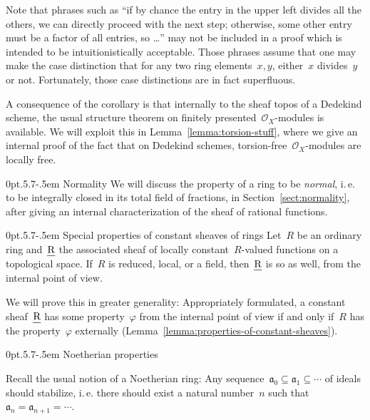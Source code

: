 \documentclass[10pt,reqno,a4paper]{amsbook}
\makeatletter
\theoremstyle{definition}
\theoremstyle{plain}
\theoremstyle{remark}
\renewcommand{\O}{\mathcal{O}}
\newcommand{\aaa}{\mathfrak{a}}
\let\oldul\ul
\renewcommand{\ul}[1]{\text{\oldul{$#1$}}}
\newcommand{\?}{\,{:}\,}
\renewcommand{\_}{\mathpunct{.}\,}
\newcommand{\ie}{i.\,e.\@\xspace}
\def\subsection{\@startsection{subsection}{2}%
  {0pt}{.5\linespacing\@plus.7\linespacing}{-.5em}%
  {\normalfont\bfseries}}
\makeatother
\begin{document}
Note that phrases such as ``if by chance the entry in the upper left divides
all the others, we can directly proceed with the next step; otherwise, some
other entry must be a factor of all entries, so \ldots'' may not be included in
a proof which is intended to be intuitionistically acceptable.
Those phrases assume that one may make the case distinction that for
any two ring elements~$x,y$, either~$x$ divides~$y$ or not. Fortunately, those
case distinctions are in fact superfluous.

A consequence of the corollary is that internally to the sheaf topos of a
Dedekind scheme, the usual structure theorem on finitely
presented~$\O_X$-modules is available. We will exploit this in
Lemma~\ref{lemma:torsion-stuff}, where we give an internal proof of the
fact that on Dedekind schemes, torsion-free~$\O_X$-modules are locally free.


\subsection{Normality} We will discuss the property of a ring to be
\emph{normal}, \ie to be integrally closed in its total field of
fractions, in Section~\ref{sect:normality}, after giving an internal
characterization of the sheaf of rational functions.


\subsection{Special properties of constant sheaves of rings} Let~$R$ be an
ordinary ring and~$\ul{R}$ the associated sheaf of locally constant~$R$-valued
functions on a topological space. If~$R$ is reduced, local, or a field,
then~$\ul{R}$ is so as well, from the internal point of view.

We will prove this in greater generality: Appropriately formulated, a constant
sheaf~$\ul{R}$ has some property~$\varphi$ from the internal point of view if
and only if~$R$ has the property~$\varphi$ externally
(Lemma~\ref{lemma:properties-of-constant-sheaves}).


\subsection{Noetherian properties}
\label{sect:noetherian}

Recall the usual notion of a Noetherian ring: Any sequence~$\aaa_0 \subseteq
\aaa_1 \subseteq \cdots$ of ideals should stabilize, \ie there should exist a
natural number~$n$ such that~$\aaa_n = \aaa_{n+1} = \cdots$.
\end{document}
